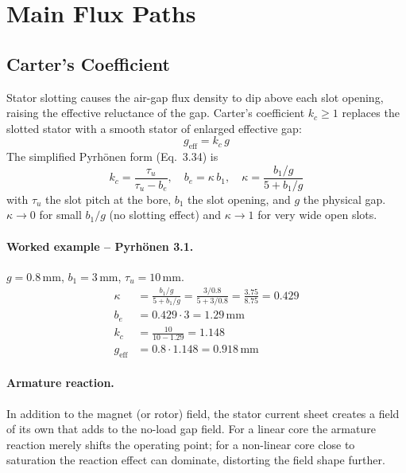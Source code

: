 \documentclass[12pt,a4paper]{article}
\newcommand{\unit}[1]{\ensuremath{\,\mathrm{#1}}}
\begin{document}
\section{Main Flux Paths}
\label{sec:carter}

\subsection{Carter's Coefficient}

Stator slotting causes the air-gap flux density to dip above each slot
opening, raising the effective reluctance of the gap. Carter's
coefficient $k_c \ge 1$ replaces the slotted stator with a smooth
stator of enlarged effective gap:
\begin{equation}
  g_\text{eff} = k_c\,g
\end{equation}
The simplified Pyrh\"onen form (Eq.~3.34) is
\begin{equation}
  k_c = \frac{\tau_u}{\tau_u - b_e},
  \quad
  b_e = \kappa\,b_1,
  \quad
  \kappa = \frac{b_1/g}{5 + b_1/g}
  \label{eq:carter}
\end{equation}
with $\tau_u$ the slot pitch at the bore, $b_1$ the slot opening, and
$g$ the physical gap. $\kappa\to 0$ for small $b_1/g$ (no slotting
effect) and $\kappa\to 1$ for very wide open slots.

\paragraph{Worked example -- Pyrh\"onen 3.1.}
$g = 0.8\unit{mm}$, $b_1 = 3\unit{mm}$, $\tau_u = 10\unit{mm}$.
\begin{align*}
  \kappa &= \frac{b_1/g}{5 + b_1/g}
          = \frac{3/0.8}{5 + 3/0.8}
          = \frac{3.75}{8.75} = 0.429\\
  b_e    &= 0.429 \cdot 3 = 1.29\unit{mm}\\
  k_c    &= \frac{10}{10 - 1.29} = 1.148\\
  g_\text{eff} &= 0.8\cdot 1.148 = 0.918\unit{mm}
\end{align*}

\paragraph{Armature reaction.}
In addition to the magnet (or rotor) field, the stator current sheet
creates a field of its own that adds to the no-load gap field. For a
linear core the armature reaction merely shifts the operating point;
for a non-linear core close to saturation the reaction effect can
dominate, distorting the field shape further.
\end{document}
